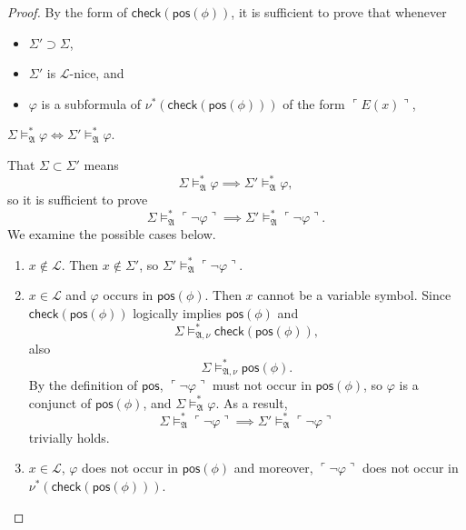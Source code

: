 \documentclass[12pt, twoside]{memoir}
\numberwithin{equation}{section}
\theoremstyle{definition}
\theoremstyle{remark}
\theoremstyle{definition}
\theoremstyle{definition}
\theoremstyle{definition}
\theoremstyle{remark}
\begin{document}
\begin{proof}
By the form of $\mathsf{check}(\mathsf{pos}(\phi))$, it is sufficient to prove that whenever 
\begin{itemize}
    \item $\Sigma' \supset \Sigma$,
    \item $\Sigma'$ is $\mathcal{L}$-nice, and
    \item $\varphi$ is a subformula of $\nu^*(\mathsf{check}(\mathsf{pos}(\phi)))$ of the form $\ulcorner E(x) \urcorner$,
\end{itemize}
 $\Sigma \models^*_{\mathfrak{A}} \varphi \iff \Sigma' \models^*_{\mathfrak{A}} \varphi$. 
 
That $\Sigma \subset \Sigma'$ means $$\Sigma \models^*_{\mathfrak{A}} \varphi \implies \Sigma' \models^*_{\mathfrak{A}} \varphi,$$ so it is sufficient to prove $$\Sigma \models^*_{\mathfrak{A}} \ulcorner \neg \varphi \urcorner \implies \Sigma' \models^*_{\mathfrak{A}} \ulcorner \neg \varphi \urcorner.$$ We examine the possible cases below.
\begin{enumerate}[label=Case \arabic*:, leftmargin=50pt]
    \item $x \not\in \mathcal{L}$. Then $x \not\in \Sigma'$, so $\Sigma' \models^*_{\mathfrak{A}} \ulcorner \neg \varphi \urcorner$.
    \item $x \in \mathcal{L}$ and $\varphi$ occurs in $\mathsf{pos}(\phi)$. Then $x$ cannot be a variable symbol. Since $\mathsf{check}(\mathsf{pos}(\phi))$ logically implies $\mathsf{pos}(\phi)$ and $$\Sigma \models^*_{\mathfrak{A}, \nu} \mathsf{check}(\mathsf{pos}(\phi)),$$ also $$\Sigma \models^*_{\mathfrak{A}, \nu} \mathsf{pos}(\phi).$$ By the definition of $\mathsf{pos}$, $\ulcorner \neg \varphi \urcorner$ must not occur in $\mathsf{pos}(\phi)$, so $\varphi$ is a conjunct of $\mathsf{pos}(\phi)$, and $\Sigma \models^*_{\mathfrak{A}} \varphi$. As a result, $$\Sigma \models^*_{\mathfrak{A}} \ulcorner \neg \varphi \urcorner \implies \Sigma' \models^*_{\mathfrak{A}} \ulcorner \neg \varphi \urcorner$$ trivially holds.
    \item $x \in \mathcal{L}$, $\varphi$ does not occur in $\mathsf{pos}(\phi)$ and moreover, $\ulcorner \neg \varphi \urcorner$ does not occur in $\nu^*(\mathsf{check}(\mathsf{pos}(\phi)))$. 
    

\end{enumerate}
\end{proof}
\end{document}
